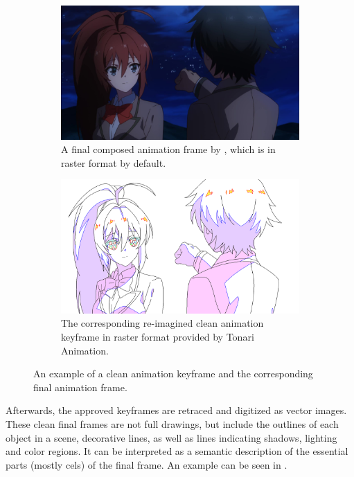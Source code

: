 \begin{figure}[h!]
    \begin{subfigure}[b]{\textwidth}
    \includegraphics[width=\textwidth]{graphics/douga/39.png}
    \caption{A final composed animation frame by \citet{isekai-cheat-magician}, which is in raster format by default.}
    \label{fig:douga.example.final}
    \end{subfigure}
    \vfill
    \begin{subfigure}[b]{\textwidth}
    \includegraphics[width=\textwidth]{graphics/douga/836.19.png}
    \caption{The corresponding re-imagined clean animation keyframe in raster format provided by Tonari Animation.}
    \label{fig:douga.example.clean}
    \end{subfigure}
\caption{An example of a clean animation keyframe and the corresponding final animation frame.}
\label{fig:douga.example}
\end{figure}


Afterwards, the approved keyframes are retraced and digitized as vector images. These clean final frames are not full drawings, but include the outlines of each object in a scene, decorative lines, as well as lines indicating shadows, lighting and color regions. It can be interpreted as a semantic description of the essential parts (mostly cels) of the final frame. An example can be seen in . 

